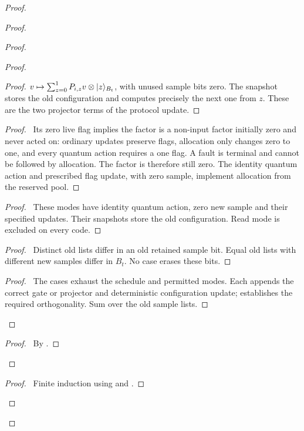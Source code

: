 \begin{proof}
\begin{proof}
\begin{proof}
\begin{proof}
\begin{proof}
  $v\mapsto\sum_{z=0}^1P_{i,z}v\otimes\lvert z\rangle_{B_t}$,
  with unused sample bits zero. The snapshot stores the old
  configuration and computes precisely the next one from $z$.
  These are the two projector terms of the protocol update.\end{proof}
  \begin{proof}\pf\ Its zero live flag implies the factor is a
  non-input factor initially zero and never acted on: ordinary
  updates preserve flags, allocation only changes zero to one,
  and every quantum action requires a one flag. A fault is terminal
  and cannot be followed by allocation. The factor is therefore
  still zero. The identity quantum action and prescribed flag update,
  with zero sample, implement allocation from the reserved pool.\end{proof}
  \begin{proof}\pf\ These modes have identity quantum action,
  zero new sample and their specified updates. Their snapshots
  store the old configuration. Read mode is excluded on every code.\end{proof}
  \begin{proof}\pf\ Distinct old lists differ in an old retained
  sample bit. Equal old lists with different new samples differ
  in $B_t$. No case erases these bits.\end{proof}
  \qedstep
  \begin{proof}\pf\ The cases exhaust the schedule and permitted
  modes. Each appends the correct gate or projector and deterministic
  configuration update;  establishes
  the required orthogonality. Sum over the old sample lists.\end{proof}
 \end{proof}
 \qedstep
 \begin{proof}\pf\ By .\end{proof}
\end{proof}
  \qedstep
  \begin{proof}\pf\ Finite induction using
   and .\end{proof}
 \end{proof}

\end{proof}
